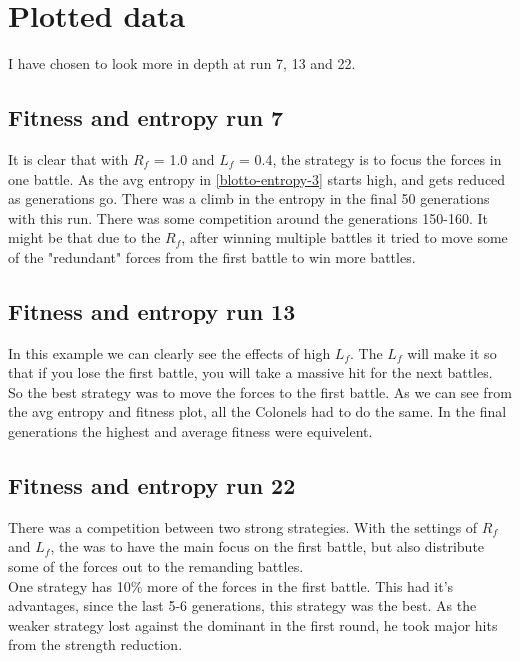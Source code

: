 \section{Plotted data}

I have chosen to look more in depth at run 7, 13 and 22.

\subsection{Fitness and entropy run 7}

It is clear that with $R_f$ = 1.0 and $L_f$ = 0.4, the strategy is to focus the forces in one 
battle. As the avg entropy in \autoref{blotto-entropy-3} starts high, and gets reduced as generations go.
There was a climb in the entropy in the final 50 generations with this run. There was some competition 
around the generations 150-160. It might be that due to the $R_f$, after winning multiple battles
it tried to move some of the "redundant" forces from the first battle to win more battles.

\subsection{Fitness and entropy run 13}

In this example we can clearly see the effects of high $L_f$. The $L_f$ will make it so that if
you lose the first battle, you will take a massive hit for the next battles. So the best strategy
was to move the forces to the first battle. As we can see from the avg entropy and fitness plot,
all the Colonels had to do the same. In the final generations the highest and average fitness
were equivelent. 

\subsection{Fitness and entropy run 22}

There was a competition between two strong strategies. With the settings of $R_f$ and $L_f$, the
was to have the main focus on the first battle, but also distribute some of the forces out to the remanding
battles. \\

One strategy has 10\% more of the forces in the first battle. This had it's advantages, since the last 5-6 generations,
this strategy was the best. As the weaker strategy lost against the dominant in the first round, he took major hits
from the strength reduction.
